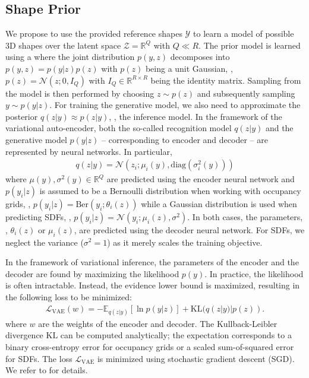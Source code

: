 \subsection{Shape Prior}
\label{subsec:method-prior}

We propose to use the provided reference shapes $\mathcal{Y}$ to learn a model of possible 3D shapes over the latent space $\mathcal{Z} = \mathbb{R}^Q$ with $Q \ll R$. The prior model is learned using a \VAE where the joint distribution $p(y, z)$ decomposes into $p(y, z) = p(y | z)p(z)$ with $p(z)$ being a unit Gaussian, \ie, $p(z) = \mathcal{N}(z;0, I_Q)$ with $I_Q \in \mathbb{R}^{R \times R}$ being the identity matrix. Sampling from the model is then performed by choosing $z \sim p(z)$ and subsequently sampling $y \sim p(y | z)$. For training the generative model, we also need to approximate the posterior $q(z | y) \approx p(z | y)$, \ie, the inference model. In the framework of the variational auto-encoder, both the so-called recognition model $q(z | y)$ and the generative model $p(y | z)$ -- corresponding to encoder and decoder -- are represented by neural networks. In particular,
\begin{align}
q(z | y) = \mathcal{N}(z_i; \mu_i(y), \text{diag}(\sigma_i^2(y)))
\end{align}
where $\mu(y), \sigma^2(y) \in \mathbb{R}^Q$ are predicted using the encoder neural network and $p(y_i | z)$ is assumed to be a Bernoulli distribution when working with occupancy grids, \ie, $p(y_i | z) = \text{Ber}(y_i ; \theta_i(z))$ while a Gaussian distribution is used when predicting SDFs, \ie, $p(y_i | z) = \mathcal{N}(y_i ; \mu_i(z), \sigma^2)$. In both cases, the parameters, \ie, $\theta_i(z)$ or $\mu_i(z)$, are predicted using the decoder neural network. For SDFs, we neglect the variance ($\sigma^2 = 1$) as it merely scales the training objective.

In the framework of variational inference, the parameters of the encoder and the decoder are found by maximizing the likelihood $p(y)$. In practice, the likelihood is often intractable. Instead, the evidence lower bound is maximized, resulting in the following loss to be minimized:
\begin{align}
\mathcal{L}_{\text{VAE}}(w) = - \mathbb{E}_{q(z |y)}[\ln p(y|z)] + \text{KL}(q(z | y)| p(z)).
\end{align}
where $w$ are the weights of the encoder and decoder. The Kullback-Leibler divergence $\text{KL}$ can be computed analytically; the expectation corresponds to a binary cross-entropy error for occupancy grids or a scaled sum-of-squared error for SDFs. The loss $\mathcal{L}_{\text{VAE}}$ is minimized using stochastic gradient descent (SGD). We refer to \cite{Kingma2013ARXIV} for details.

